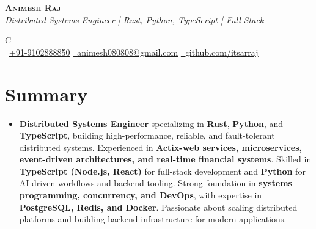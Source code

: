 \documentclass[a4paper,11pt]{article}
\newcommand{\resumeSubHeadingListStart}{\begin{itemize}[leftmargin=*,labelsep=0mm, itemsep=0mm, label={}]}
\newcommand{\resumeSubHeadingListEnd}{\end{itemize}\vspace{2mm}}
\begin{document}



\begin{center}
    \textbf{\Huge \scshape Animesh Raj} \\[0.4em]
    \textit{Distributed Systems Engineer | Rust, Python, TypeScript | Full-Stack} \\[0.4em]
    \small
    \begin{tabularx}{\linewidth}{C} \\
        {\raisebox{0.0\height}{\footnotesize \faPhone}\ \underline{+91-9102888850}} \hspace{4pt}
        \href{mailto:animesh080808@gmail.com}{\raisebox{0.0\height}{\footnotesize \faEnvelope}\ \underline{animesh080808@gmail.com}} \hspace{4pt}
        \href{https://github.com/itsarraj}{\raisebox{0.0\height}{\footnotesize \faGithub}\ \underline{github.com/itsarraj}} \hspace{4pt}
    \end{tabularx}
\end{center}

\vspace{-16pt}

\section{\textbf{Summary}}
 \resumeSubHeadingListStart
    \item{
        \textbf{Distributed Systems Engineer} specializing in \textbf{Rust}, \textbf{Python}, and \textbf{TypeScript}, building high-performance, reliable, and fault-tolerant distributed systems. Experienced in \textbf{Actix-web services, microservices, event-driven architectures, and real-time financial systems}. Skilled in \textbf{TypeScript (Node.js, React)} for full-stack development and \textbf{Python} for AI-driven workflows and backend tooling. Strong foundation in \textbf{systems programming, concurrency, and DevOps}, with expertise in \textbf{PostgreSQL, Redis, and Docker}. Passionate about scaling distributed platforms and building backend infrastructure for modern applications.
    }
 \resumeSubHeadingListEnd
\vspace{-16pt}
\end{document}
